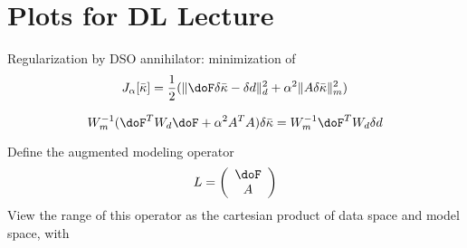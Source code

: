 \section{Plots for DL Lecture}




Regularization by DSO annihilator: minimization of 
\begin{equation}
\label{eqn:regobj}
J_{\alpha}[\bar{\kappa}] =\frac{1}{2}( \|\doF \delta \bar{\kappa}
-\delta d\|_d^2 +\alpha^2
\|A\delta \bar{\kappa}\|^2_m)
\end{equation}

\begin{equation}
\label{eqn:regnormal}
W_m^{-1}(\doF^T W_d \doF + \alpha^2 A^TA)\delta \bar{\kappa} =
W_m^{-1}\doF^T W_d \delta d
\end{equation}

Define the augmented modeling operator
\begin{equation}
\label{eqn:columnop}
L = \left(\begin{array}{c}
\doF\\
A
\end{array}
\right) 
\end{equation}
View the range of this operator as the cartesian product of data
space and model space, with 
